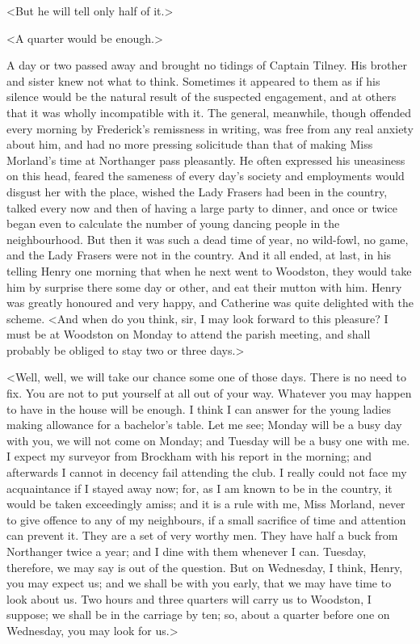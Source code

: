  <But he will tell only half of it.> 

 <A quarter would be enough.> 

 A day or two passed away and brought no tidings of Captain Tilney. His brother and sister knew not what to think. Sometimes it appeared to them as if his silence would be the natural result of the suspected engagement, and at others that it was wholly incompatible with it. The general, meanwhile, though offended every morning by Frederick's remissness in writing, was free from any real anxiety about him, and had no more pressing solicitude than that of making Miss Morland's time at Northanger pass pleasantly. He often expressed his uneasiness on this head, feared the sameness of every day's society and employments would disgust her with the place, wished the Lady Frasers had been in the country, talked every now and then of having a large party to dinner, and once or twice began even to calculate the number of young dancing people in the neighbourhood. But then it was such a dead time of year, no wild-fowl, no game, and the Lady Frasers were not in the country. And it all ended, at last, in his telling Henry one morning that when he next went to Woodston, they would take him by surprise there some day or other, and eat their mutton with him. Henry was greatly honoured and very happy, and Catherine was quite delighted with the scheme. <And when do you think, sir, I may look forward to this pleasure? I must be at Woodston on Monday to attend the parish meeting, and shall probably be obliged to stay two or three days.> 

 <Well, well, we will take our chance some one of those days. There is no need to fix. You are not to put yourself at all out of your way. Whatever you may happen to have in the house will be enough. I think I can answer for the young ladies making allowance for a bachelor's table. Let me see; Monday will be a busy day with you, we will not come on Monday; and Tuesday will be a busy one with me. I expect my surveyor from Brockham with his report in the morning; and afterwards I cannot in decency fail attending the club. I really could not face my acquaintance if I stayed away now; for, as I am known to be in the country, it would be taken exceedingly amiss; and it is a rule with me, Miss Morland, never to give offence to any of my neighbours, if a small sacrifice of time and attention can prevent it. They are a set of very worthy men. They have half a buck from Northanger twice a year; and I dine with them whenever I can. Tuesday, therefore, we may say is out of the question. But on Wednesday, I think, Henry, you may expect us; and we shall be with you early, that we may have time to look about us. Two hours and three quarters will carry us to Woodston, I suppose; we shall be in the carriage by ten; so, about a quarter before one on Wednesday, you may look for us.> 

